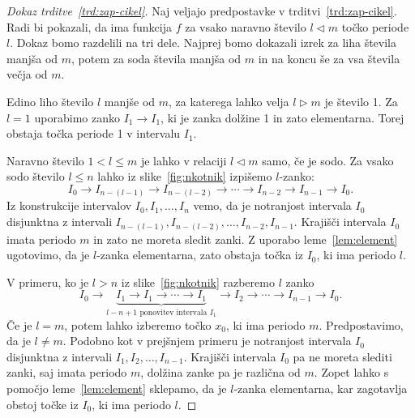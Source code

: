 \documentclass[mat2]{fmfdelo}
\begin{document}
\begin{proof}[Dokaz trditve~\ref{trd:zap-cikel}]
Naj veljajo predpostavke v trditvi~\ref{trd:zap-cikel}. Radi bi pokazali, da ima funkcija $f$ za vsako naravno število $l\triangleleft m$ točko periode $l$. Dokaz bomo razdelili na tri dele. Najprej bomo dokazali izrek za liha števila manjša od $m$, potem za soda števila manjša od $m$ in na koncu še za vsa števila večja od $m$.

Edino liho število $l$ manjše od $m$, za katerega lahko velja $l\triangleright m$ je število 1. Za $l=1$ uporabimo zanko $I_1 \to I_1$, ki je zanka dolžine 1 in zato elementarna. Torej obstaja točka periode 1 v intervalu $I_1$.

Naravno število  $1<l \leq m$ je lahko v relaciji $l \triangleleft m$ samo, če je sodo. Za vsako sodo število $l \leq n$ lahko iz slike~\ref{fig:nkotnik} izpišemo $l$-zanko:
$$I_0\to I_{n-(l-1)} \to I_{n-(l-2)} \to \cdots \to I_{n-2} \to I_{n-1} \to I_0.$$
Iz konstrukcije intervalov $I_0, I_1, \dots, I_n$ vemo, da je notranjost intervala $I_0$ disjunktna z intervali $I_{n-(l-1)}, I_{n-(l-2)}, \dots, I_{n-2}, I_{n-1}$. Krajišči intervala $I_0$ imata periodo $m$ in zato ne moreta sledit zanki. Z uporabo leme~\ref{lem:element} ugotovimo, da je $l$-zanka elementarna, zato obstaja točka iz $I_0$, ki ima periodo $l$.

V primeru, ko je $l >n$ iz slike~\ref{fig:nkotnik} razberemo $l$ zanko
$$I_0\to\underbrace{I_1 \to I_1 \to \cdots  \to I_1}_{l - n +1 \text{ ponovitev intervala } I_1} \to I_2 \to \cdots \to I_{n-1} \to I_0.$$
Če je $l=m$, potem lahko izberemo točko $x_0$, ki ima periodo $m$. Predpostavimo, da je $l \neq m$. Podobno kot v prejšnjem primeru je notranjost intervala $I_0$ disjunktna z intervali $I_1, I_2, \dots, I_{n-1}$. Krajišči intervala $I_0$ pa ne moreta slediti zanki, saj imata periodo $m$, dolžina zanke pa je različna od $m$. Zopet lahko s pomočjo leme~\ref{lem:element} sklepamo, da je $l$-zanka elementarna, kar zagotavlja obstoj točke iz $I_0$, ki ima periodo $l$.
\end{proof}

\end{document}
